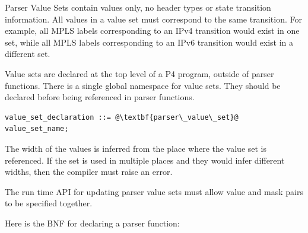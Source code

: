 \documentclass[12pt]{article}
\begin{document}
Parser Value Sets contain values only, no header types or state transition 
information. All values in a value set must correspond to the same transition. 
For example, all MPLS labels corresponding to an IPv4 transition would exist 
in one set, while all MPLS labels corresponding to an IPv6 transition would 
exist in a different set.

Value sets are declared at the top level of a P4 program, outside of parser 
functions. There is a single global namespace for value sets. They should 
be declared before being referenced in parser functions.

\begin{lstlisting}[frame=single,backgroundcolor=\color{bnfgreen},escapechar=\@]
value_set_declaration ::= @\textbf{parser\_value\_set}@ value_set_name;
\end{lstlisting}

The width of the values is inferred from the place where the value set is 
referenced.  If the set is used in multiple places and they would infer
different widths, then the compiler must raise an error.

The run time API for updating parser value sets must allow value and mask
pairs to be specified together.


Here is the BNF for declaring a parser function:
\end{document}
